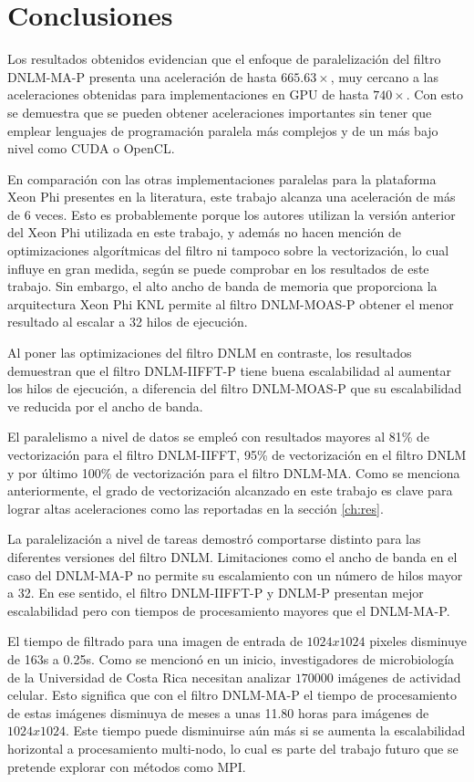 \chapter{Conclusiones}
\label{ch:concl}

Los resultados obtenidos evidencian que el enfoque de paralelizaci\'on del filtro DNLM-MA-P presenta una aceleraci\'on de hasta $665.63\times$, muy cercano a las aceleraciones obtenidas para implementaciones en GPU de hasta $740\times$. Con esto se demuestra que se pueden obtener aceleraciones importantes sin tener que emplear lenguajes de programaci\'on paralela m\'as complejos y de un m\'as bajo nivel como CUDA o OpenCL.


En comparaci\'on con las otras implementaciones paralelas para la plataforma Xeon Phi presentes en la literatura, este trabajo alcanza una aceleraci\'on de m\'as de 6 veces. Esto es probablemente porque los autores utilizan la versi\'on anterior del Xeon Phi utilizada en este trabajo, y adem\'as no hacen menci\'on de optimizaciones algor\'itmicas del filtro ni tampoco sobre la vectorizaci\'on, lo cual influye en gran medida, seg\'un se puede comprobar en los resultados de este trabajo. Sin embargo, el alto ancho de banda de memoria que proporciona la arquitectura Xeon Phi KNL permite al filtro DNLM-MOAS-P obtener el menor resultado al escalar a 32 hilos de ejecuci\'on.

Al poner las optimizaciones del filtro DNLM en contraste, los resultados demuestran que el filtro DNLM-IIFFT-P tiene buena escalabilidad al aumentar los hilos de ejecuci\'on, a diferencia del filtro DNLM-MOAS-P que su escalabilidad ve reducida por el ancho de banda. 

El paralelismo a nivel de datos se emple\'o con resultados mayores al 81\% de vectorizaci\'on para el filtro DNLM-IIFFT, 95\% de vectorizaci\'on en el filtro DNLM y por \'ultimo 100\% de vectorizaci\'on para el filtro DNLM-MA. Como se menciona anteriormente, el grado de vectorizaci\'on alcanzado en este trabajo es clave para lograr altas aceleraciones como las reportadas en la secci\'on \ref{ch:res}.

La paralelizaci\'on a nivel de tareas demostr\'o comportarse distinto para las diferentes versiones del filtro DNLM. Limitaciones como el ancho de banda en el caso del DNLM-MA-P no permite su escalamiento con un n\'umero de hilos mayor a 32. En ese sentido, el filtro DNLM-IIFFT-P y DNLM-P presentan mejor escalabilidad pero con tiempos de procesamiento mayores que el DNLM-MA-P.

El tiempo de filtrado para una imagen de entrada de $1024x1024$ pixeles disminuye de 163s a 0.25s. Como se mencion\'o en un inicio, investigadores de microbiolog\'ia de la Universidad de Costa Rica necesitan analizar $170000$ im\'agenes de actividad celular. Esto significa que con el filtro DNLM-MA-P el tiempo de procesamiento de estas im\'agenes disminuya de meses a unas 11.80 horas para im\'agenes de $1024x1024$. Este tiempo puede disminuirse a\'un m\'as si se aumenta la escalabilidad horizontal a procesamiento multi-nodo, lo cual es parte del trabajo futuro que se pretende explorar con m\'etodos como MPI.


